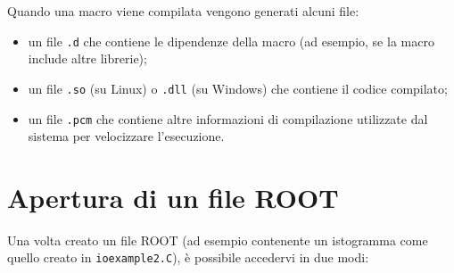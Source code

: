 \documentclass[10pt]{article}
\newcommand{\ttt}{\texttt}
\begin{document}
Quando una macro viene compilata vengono generati alcuni file:

\begin{itemize}
    \item un file \ttt{.d} che contiene le dipendenze della macro (ad esempio, se la macro include altre librerie);
    \item un file \ttt{.so} (su Linux) o \ttt{.dll} (su Windows) che contiene il codice compilato;
    \item un file \ttt{.pcm} che contiene altre informazioni di compilazione utilizzate dal sistema per velocizzare l'esecuzione.
\end{itemize}


\newpage
\section{Apertura di un file ROOT}
Una volta creato un file ROOT (ad esempio contenente un istogramma come quello creato in \ttt{ioexample2.C}), è possibile accedervi in due modi:
\end{document}
